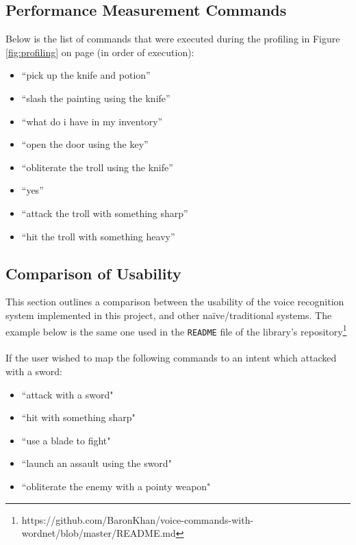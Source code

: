 \documentclass[11pt]{article}
\begin{document}
\begin{appendices}
\begin{table}[H]
\begin{tabular}{lll}
\end{tabular}
\end{table}

\newpage
\subsection{Performance Measurement Commands}
\label{appendix:profiling-commands}

Below is the list of commands that were executed during the profiling in Figure \ref{fig:profiling} on page \pageref{fig:profiling} (in order of execution):

\begin{itemize}
\item ``pick up the knife and potion''
\item ``slash the painting using the knife''
\item ``what do i have in my inventory''
\item ``open the door using the key''
\item ``obliterate the troll using the knife''
\item ``yes''
\item ``attack the troll with something sharp''
\item ``hit the troll with something heavy''
\end{itemize}

\newpage
\subsection{Comparison of Usability}
\label{appendix:comparison}

This section outlines a comparison between the usability of the voice recognition system implemented in this project, and other na\"ive/traditional systems. The example below is the same one used in the \texttt{README} file of the library's repository\footnote{https://github.com/BaronKhan/voice-commands-with-wordnet/blob/master/README.md}
\\
\\
If the user wished to map the following commands to an intent which attacked with a sword:

\begin{itemize}
\item ``attack with a sword"
\item ``hit with something sharp"
\item ``use a blade to fight"
\item ``launch an assault using the sword"
\item ``obliterate the enemy with a pointy weapon"
\end{itemize}


\end{appendices}
\end{document}
